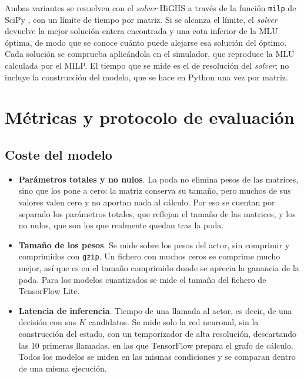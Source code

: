 Ambas variantes se resuelven con el \textit{solver} HiGHS \cite{huangfu2018parallelizing} a través de la función \texttt{milp} de SciPy \cite{virtanen2020scipy}, con un límite de tiempo por matriz. Si se alcanza el límite, el \textit{solver} devuelve la mejor solución entera encontrada y una cota inferior de la MLU óptima, de modo que se conoce cuánto puede alejarse esa solución del óptimo. Cada solución se comprueba aplicándola en el simulador, que reproduce la MLU calculada por el MILP. El tiempo que se mide es el de resolución del \textit{solver}; no incluye la construcción del modelo, que se hace en Python una vez por matriz.

\section{Métricas y protocolo de evaluación}\label{sec:metricas}

\subsection{Coste del modelo}

\begin{itemize}
	\item \textbf{Parámetros totales y no nulos}. La poda no elimina pesos de las matrices, sino que los pone a cero: la matriz conserva su tamaño, pero muchos de sus valores valen cero y no aportan nada al cálculo. Por eso se cuentan por separado los parámetros totales, que reflejan el tamaño de las matrices, y los no nulos, que son los que realmente quedan tras la poda.
	\item \textbf{Tamaño de los pesos}. Se mide sobre los pesos del actor, sin comprimir y comprimidos con \texttt{gzip}. Un fichero con muchos ceros se comprime mucho mejor, así que es en el tamaño comprimido donde se aprecia la ganancia de la poda. Para los modelos cuantizados se mide el tamaño del fichero de TensorFlow Lite.
	\item \textbf{Latencia de inferencia}. Tiempo de una llamada al actor, es decir, de una decisión con sus $K$ candidatos. Se mide solo la red neuronal, sin la construcción del estado, con un temporizador de alta resolución, descartando las 10 primeras llamadas, en las que TensorFlow prepara el grafo de cálculo. Todos los modelos se miden en las mismas condiciones y se comparan dentro de una misma ejecución.
\end{itemize}

